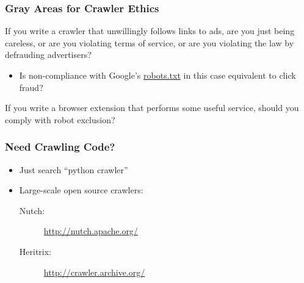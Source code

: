 \documentclass{beamer}
\begin{document}
\begin{frame} \frametitle{Gray Areas for Crawler Ethics }

If you write a crawler that unwillingly follows links to ads, are you
just being careless, or are you violating terms of service, or are you
violating the law by defrauding advertisers?
\begin{itemize}
\item Is non-compliance with Google's \url{robots.txt} in this case equivalent to click fraud?
\end{itemize}

If you write a browser extension that performs some useful service, should you comply with robot exclusion?
\end{frame}










\begin{frame} \frametitle{Need Crawling Code?}

\begin{itemize}
\item Just search ``python crawler''
\item Large-scale open source crawlers:
\begin{description}
\item [Nutch:] \url{http://nutch.apache.org/}
\item [Heritrix:] \url{http://crawler.archive.org/}
\end{description}

\end{itemize}
\end{frame}



\end{document}
